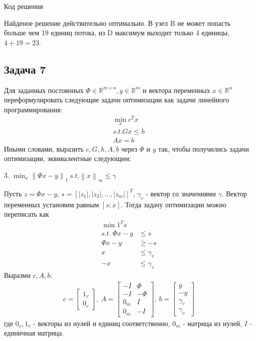 \documentclass{article}
\newcommand{\R}{\mathbb{R}}
\newcommand{\RM}[2] {\mathbb{R}^{#1 \times #2}}
\newcommand{\norm}[1]{\left\lVert#1\right\rVert}
\begin{document}
    Код решения
    
    
    Найденое решение действительно оптимально. В узел B не может попасть больше чем 19 единиц потока, из D максимум выходит только 4 единицы, $4 + 19 = 23$.
    \bigbreak
    
    \subsection*{Задача 7}
    
    Для заданных постоянных $\Phi \in \RM{m}{n}, y \in \R^m$ и вектора переменных $x \in \R^n$ переформулировать следующие задачи оптимизации как задачи линейного программирования:
    \begin{align*}
        \min_x c^Tx\\
        s.t. Gx \le h\\
        Ax = b
    \end{align*}
    Иными словами, выразить $c, G, h, A, b$ через $\Phi$ и $y$ так, чтобы получились задачи оптимизации, эквивалентные следующим:
    \bigbreak
    
    3. $\min_x \norm{\Phi x - y}_1 \: s.t. \norm{x}_{\infty} \le \gamma$
    
    Пусть $z = \Phi x - y$, $s = [|z_1|, |z_2|, ..., |z_m|]^T$, $\gamma_v$ - вектор со значениями $\gamma$. Вектор переменных установим равным $[s; x]$. Тогда задачу оптимизации можно переписать как
    \begin{align*}
        \min 1^Ts\\
        s.t. \: \Phi x - y &\le s\\
        \Phi x - y &\ge -s\\
        x &\le \gamma_v \\
        -x &\le \gamma_v
    \end{align*}
    Выразми $c, A, b$:
    \begin{align*}
        c = \left[\begin{matrix} 1_v\\ 0_v \end{matrix} \right], \:
        A = \left[
            \begin{matrix}
                -I & \Phi \\
                -I & -\Phi \\
                0_m & I \\
                0_m & -I
            \end{matrix}
            \right], \:
        b = \left[
            \begin{matrix}
                y \\
                -y \\
                \gamma_v\\
                \gamma_v
            \end{matrix}
            \right]
    \end{align*}
    где $0_v, 1_v$ - векторы из нулей и единиц соответственно, $0_m$ - матрица из нулей, $I$ - единичная матрица.
    
\end{document}
